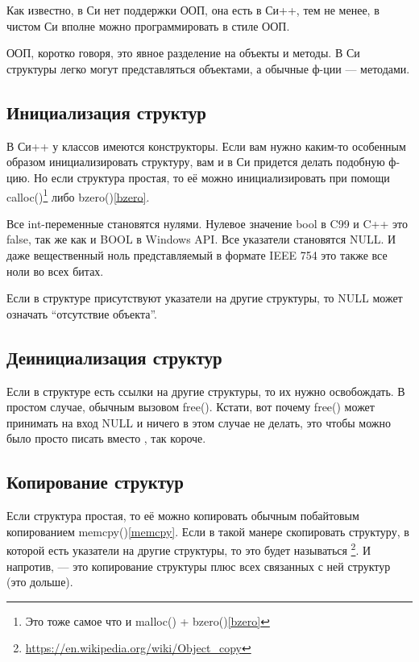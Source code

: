 \label{COOP}
\chapter{\COOPname}

Как известно, в Си нет поддержки ООП, она есть в Си++, тем не менее, в чистом Си вполне
можно программировать в стиле ООП.

ООП, коротко говоря, это явное разделение на объекты и методы. 
В Си структуры легко могут представляться объектами, а обычные ф-ции --- методами.

\section{Инициализация структур}

В Си++ у классов имеются конструкторы. Если вам нужно каким-то особенным образом инициализировать
структуру, вам и в Си придется делать подобную ф-цию. Но если структура простая, то её можно
инициализировать при помощи calloc()\footnote{Это тоже самое что и malloc() + bzero()\ref{bzero}} 
либо bzero()\ref{bzero}.

Все int-переменные становятся нулями. Нулевое значение bool в C99 и C++ это false, 
так же как и BOOL в Windows API. Все указатели становятся NULL. И даже вещественный
ноль представляемый в формате IEEE 754 это также все ноли во всех битах.

Если в структуре присутствуют указатели на другие структуры, то NULL может означать ``отсутствие объекта''.

\section{Деинициализация структур}

Если в структуре есть ссылки на другие структуры, то их нужно освобождать. В простом случае,
обычным вызовом free(). Кстати, вот почему free() может принимать на вход NULL и ничего в этом случае
не делать, это чтобы можно было просто писать  вместо 
, так короче.

\section{Копирование структур}

Если структура простая, то её можно копировать обычным побайтовым копированием memcpy()\ref{memcpy}.
Если в такой манере скопировать структуру, в которой есть указатели на другие структуры,
то это будет называться \footnote{\url{https://en.wikipedia.org/wiki/Object_copy}}. 
И напротив,  --- это копирование структуры
плюс всех связанных с ней структур (это дольше).

